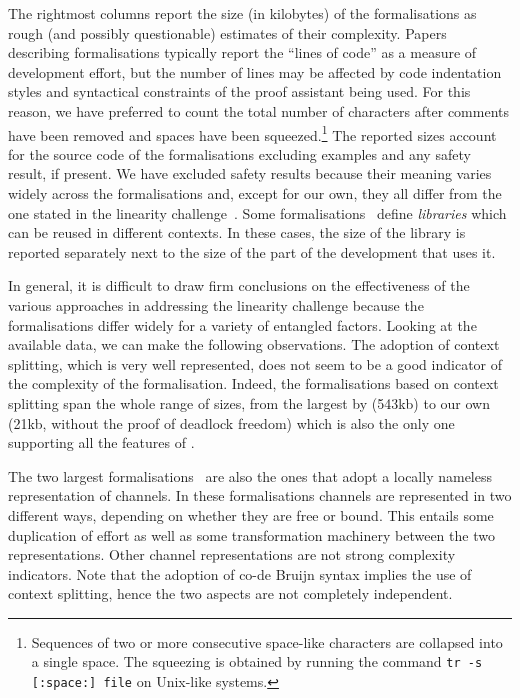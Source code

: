The rightmost columns report the size (in kilobytes) of the formalisations as
rough (and possibly questionable) estimates of their complexity. Papers
describing formalisations typically report the ``lines of code'' as a measure of
development effort, but the number of lines may be affected by code indentation
styles and syntactical constraints of the proof assistant being used. For this
reason, we have preferred to count the total number of characters after comments
have been removed and spaces have been squeezed.\footnote{Sequences of two or
more consecutive space-like characters are collapsed into a single space. The
squeezing is obtained by running the command \texttt{tr -s [:space:] file} on
Unix-like systems.}
%
The reported sizes account for the source code of the formalisations excluding
examples and any safety result, if present. We have excluded safety results
because their meaning varies widely across the formalisations and, except for
our own, they all differ from the one stated in the linearity
challenge~\citep{CarboneEtAl24}.
%
Some
formalisations~\cite{RouvoetPoulsenKrebbersVisser20,ZalakainDardha21,JacobsBalzerKrebbers22,ZackonEtAl25}
define \emph{libraries} which can be reused in different contexts. In these
cases, the size of the library is reported separately next to the size of the
part of the development that uses it.

In general, it is difficult to draw firm conclusions on the effectiveness of the
various approaches in addressing the linearity challenge because the
formalisations differ widely for a variety of entangled factors.
%
%
Looking at the available data, we can make the following observations.
%
The adoption of context splitting, which is very well represented, does not seem
to be a good indicator of the complexity of the formalisation. Indeed, the
formalisations based on context splitting span the whole range of sizes, from
the largest by \citet{GotoEtAl16} (543kb) to our own (21kb, without the proof of
deadlock freedom) which is also the only one supporting all the features of \CP.

The two largest formalisations~\cite{GotoEtAl16,CastroFerreiraYoshida20} are
also the ones that adopt a locally nameless representation of channels. In these
formalisations channels are represented in two different ways, depending on
whether they are free or bound. This entails some duplication of effort as well
as some transformation machinery between the two representations.
%
Other channel representations are not strong complexity indicators. Note that
the adoption of co-de Bruijn syntax implies the use of context splitting, hence
the two aspects are not completely independent.

